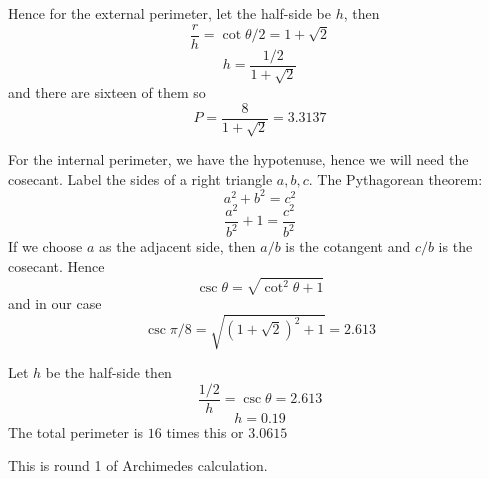 \documentclass[11pt, oneside]{article}
\begin{document}
Hence for the external perimeter, let the half-side be $h$, then
\[ \frac{r}{h} = \cot \theta/2 = 1 + \sqrt{2} \]
\[ h = \frac{1/2}{1 + \sqrt{2}} \]
and there are sixteen of them so
\[ P = \frac{8}{1 + \sqrt{2}} = 3.3137 \]

For the internal perimeter, we have the hypotenuse, hence we will need the cosecant.  Label the sides of a right triangle $a,b,c$.  The Pythagorean theorem:
\[ a^2 + b^2 = c^2 \]
\[ \frac{a^2}{b^2} + 1 = \frac{c^2}{b^2} \]
If we choose $a$ as the adjacent side, then $a/b$ is the cotangent and $c/b$ is the cosecant.  Hence
\[ \csc \theta = \sqrt{\cot^2 \theta + 1} \]
and in our case
\[ \csc \pi/ 8 = \sqrt{ (1 + \sqrt{2})^2 + 1 } = 2.613 \]

Let $h$ be the half-side then
\[ \frac{1/2}{h} = \csc \theta = 2.613 \]
\[ h = 0.19 \]
The total perimeter is $16$ times this or $3.0615$

This is round 1 of Archimedes calculation.
\end{document}
